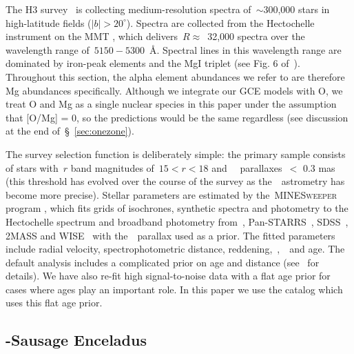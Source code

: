 \documentclass[foo.tex]{subfiles}
\begin{document}
The H3 survey~\citep{Conroy2019} is collecting medium-resolution spectra
of~$\sim$300,000 stars in high-latitude fields ($\left|b\right| > 20^\circ$).
Spectra are collected from the Hectochelle instrument on the MMT
\citep{Szentgyorgyi2011}, which delivers~$R \approx$~32,000 spectra over the
wavelength range of~$5150 - 5300$~\AA.
Spectral lines in this wavelength range are dominated by iron-peak elements and
the MgI triplet (see Fig. 6 of~\citealt{Conroy2019}).
Throughout this section, the alpha element abundances we refer to are therefore
Mg abundances specifically.
{\color{red}
Although we integrate our GCE models with O, we treat O and Mg as a single
nuclear species in this paper under the assumption that [O/Mg] = 0, so the
predictions would be the same regardless (see discussion at the end
of~\S~\ref{sec:onezone}).
}
\par
The survey selection function is deliberately simple: the primary sample
consists of stars with~$r$ band magnitudes of~$15 < r < 18$
and~\gaia~\citep{Gaia2016} parallaxes~$<$ 0.3 mas (this threshold has evolved
over the course of the survey as the~\gaia~astrometry has become more precise).
Stellar parameters are estimated by the~\textsc{MINESweeper} program
\citep{Cargile2020}, which fits grids of isochrones, synthetic spectra and
photometry to the Hectochelle spectrum and broadband photometry from~\gaia,
Pan-STARRS~\citep{Chambers2016}, SDSS~\citep{York2000}, 2MASS
\citep{Skrutskie2006} and WISE~\citep{Wright2010} with the~\gaia~parallax
used as a prior.
The fitted parameters include radial velocity, spectrophotometric distance,
reddening,~\feh,~\afe~and age.
The default analysis includes a complicated prior on age and distance
(see~\citealt{Cargile2020} for details).
We have also re-fit high signal-to-noise data with a flat age prior for cases
where ages play an important role.
In this paper we use the catalog which uses this flat age prior.

\subsection{\gaia-Sausage Enceladus}
\label{sec:h3:gse}
\end{document}
